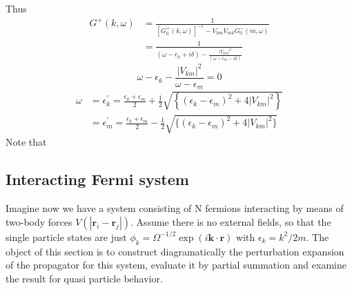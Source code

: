 Thus
\begin{equation}\begin{aligned}
G^{+}(k, \omega) &=\frac{1}{\left[G_{0}^{+}(k, \omega)\right]^{-1}-V_{k m} V_{m k} G_{0}^{-}(m, \omega)} \\
&=\frac{1}{\left(\omega-\epsilon_{k}+i \delta\right)-\frac{\left|V_{k m}\right|^{2}}{\left(\omega-\epsilon_{m}-i \delta\right)}}
\end{aligned}\end{equation}
$$\omega-\epsilon_{k}-\frac{\left|V_{k m}\right|^{2}}{\omega-\epsilon_{m}}=0$$
$$\begin{aligned}
\omega &=\epsilon_{k}^{\prime}=\frac{\epsilon_{k}+\epsilon_{m}}{2}+\frac{1}{2} \sqrt{\left\{\left(\epsilon_{k}-\epsilon_{m}\right)^{2}+4\left|V_{k m}\right|^{2}\right\}} \\
&=\epsilon_{m}^{\prime}=\frac{\epsilon_{k}+\epsilon_{m}}{2}-\frac{1}{2} \sqrt{\{(\epsilon_{k}-\epsilon_{m})^{2}+4|V_{k m}|^{2}\}}
\end{aligned}$$
Note that 

\subsection{Interacting Fermi system}
Imagine now we have a system consisting of N fermions interacting by means of two-body forces $V(|\mathbf{r}_i-\mathbf{r}_j|)$. Assume there is no external fields, so that the single particle states are just $\phi_{k}=\Omega^{-1/2} \exp (i \mathbf{k} \cdot \mathbf{r})$ with $\epsilon_k=k^2/2m$. The object of this section is to construct diagramatically the perturbation expansion of the propagator for this system, evaluate it by partial summation and examine the result for quasi particle behavior.

